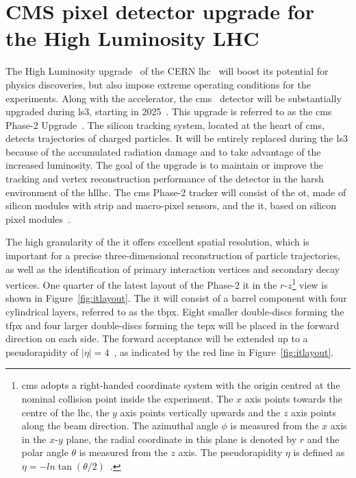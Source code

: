 \section{CMS pixel detector upgrade for the High Luminosity LHC}
\label{sec:intro}

The High Luminosity upgrade~\citep{hllhc} of the CERN \gls{lhc}~\citep{lhc} will boost its potential for physics discoveries, but also impose extreme operating conditions for the experiments. Along with the accelerator, the \gls{cms}~\citep{cms_exp} detector will be substantially upgraded during \acrlong{ls3}, starting in \num{2025}~\citep{hllhc_web}. This upgrade is referred to as the \gls{cms} Phase-2 Upgrade~\citep{cms_p2}.
The silicon tracking system, located at the heart of \gls{cms}, detects trajectories of charged particles. It will be entirely replaced during the \acrlong{ls3} because of the accumulated radiation damage and to take advantage of the increased luminosity. The goal of the upgrade is to maintain or improve the tracking and vertex reconstruction performance of the detector in the harsh environment of the \gls{hllhc}. The \gls{cms} Phase-2 tracker will consist of the \acrlong{ot}, made of silicon modules with strip and macro-pixel sensors, and the \gls{it}, based on silicon pixel modules~\citep{p2_tdr}.

The high granularity of the \gls{it} offers excellent spatial resolution, which is important for a precise three-dimensional reconstruction of particle trajectories, as well as the identification of primary interaction vertices and secondary decay vertices. 
One quarter of the latest layout of the Phase-2 \gls{it} in the $r$-$z$\footnote{\gls{cms} adopts a right-handed coordinate system with the origin centred at the nominal collision point inside the experiment. The $x$ axis points towards the centre of the \gls{lhc}, the $y$ axis points vertically upwards and the $z$ axis points along the beam direction. The azimuthal angle $\phi$ is measured from the $x$ axis in the $x$-$y$ plane, the radial coordinate in this plane is denoted by $r$ and the polar angle $\theta$ is measured from the $z$ axis. The pseudorapidity $\eta$ is defined as $\eta = -ln\tan (\theta/2)$~\citep{p2_tdr}.} 
view is shown in Figure~\ref{fig:itlayout}. The \gls{it} will consist of a barrel component with four cylindrical layers, referred to as the \gls{tbpx}. Eight smaller double-discs forming the \gls{tfpx} and four larger double-discs forming the \gls{tepx} will be placed in the forward direction on each side. The forward acceptance will be extended up to a pseudorapidity of $|\eta| = 4$~\citep{p2_tdr}, as indicated by the red line in Figure~\ref{fig:itlayout}.

